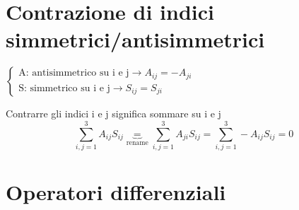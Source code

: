 \section*{Contrazione di indici simmetrici/antisimmetrici}
$\begin{cases}
    \text{A: antisimmetrico su i e j} \rightarrow A_{ij}=-A_{ji} \\
    \text{S: simmetrico su i e j} \rightarrow S_{ij} = S_{ji}
\end{cases}$ \newline

\noindent Contrarre gli indici i e j significa sommare su i e j
\begin{equation*}
    \sum_{i,j=1}^3 A_{ij}S_{ij}\underbrace{=}_{\text{rename}}\sum_{i,j=1}^3 A_{ji}S_{ij} = \sum_{i,j=1}^3 -A_{ij}S_{ij} =0
\end{equation*}

\section{Operatori differenziali}


